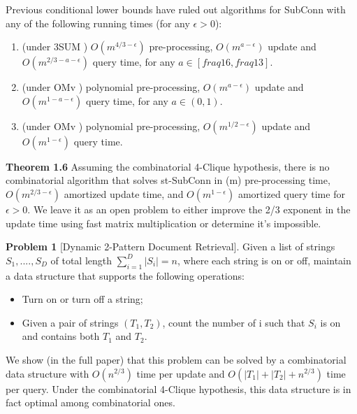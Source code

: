 \documentclass[preprint,10pt]{elsarticle}
\begin{document}
\begin{multicols}{2}
Previous conditional lower bounds have ruled out algorithms for
SubConn with any of the following running times (for any $\epsilon > 0$):

   \begin{enumerate}
        \item (under 3SUM \cite{6979028}) $O(m^{4/3-\epsilon})$ pre-processing, $O(m^{a-\epsilon})$ update and $O(m^{2/3-a-\epsilon})$ query time, for any $a \in [fraq{1}{6},fraq{1}{3}]$.
\item (under OMv \cite{10.1145/2746539.2746609}) polynomial pre-processing, $O(m^{a-\epsilon})$  update and $O(m^{1-a-\epsilon})$ query time, for any $a \in (0, 1)$.

\item (under OMv \cite{10.1145/2746539.2746609}) polynomial pre-processing, $O(m^{1/2-\epsilon})$ update and $O(m^{1-\epsilon})$ query time.

\end{enumerate}

\textbf{Theorem 1.6}\label{1.6} Assuming the combinatorial 4-Clique hypothesis,
there is no combinatorial algorithm that solves st-SubConn in (m) pre-processing time, $O(m^{2/3-\epsilon})$ amortized update time, and $O(m^{1-\epsilon})$ amortized query time for $\epsilon > 0$.
We leave it as an open problem to either improve the 2/3 exponent in the update time using fast matrix multiplication or determine it’s impossible.

  \textbf{Problem 1}\label{prob 1} [Dynamic 2-Pattern Document Retrieval]. Given a list
of strings $S_1,....,S_D$ of total length $\sum_{i=1}^{D} |S_i| = n$, where each string is on or off, maintain a data structure that supports the following
operations:
\begin{itemize}
    \item Turn on or turn off a string;
    \item  Given a pair of strings $(T_1,T_2)$, count the number of i such that $S_i$ is on and contains both $T_1$ and $T_2$.
    \end{itemize}
            

We show (in the full paper) that this problem can be solved
by a combinatorial data structure with $O(n^{2/3})$ time per update
and $O(|T_1| + |T_2|+n^{2/3})$ time per query. Under the combinatorial 4-Clique hypothesis, this data structure is in fact optimal among combinatorial ones.\\







\end{multicols}
\end{document}
